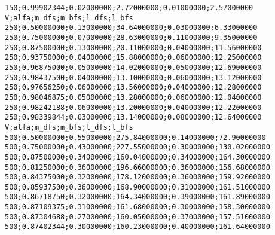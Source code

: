 \documentclass[brazil,times]{abnt}
\begin{document}
\begin{verbatim}
150;0.99902344;0.02000000;2.72000000;0.01000000;2.57000000
V;alfa;m_dfs;m_bfs;l_dfs;l_bfs
250;0.50000000;0.13000000;34.64000000;0.03000000;6.33000000
250;0.75000000;0.07000000;28.63000000;0.11000000;9.35000000
250;0.87500000;0.13000000;20.11000000;0.04000000;11.56000000
250;0.93750000;0.04000000;15.88000000;0.06000000;12.25000000
250;0.96875000;0.05000000;14.02000000;0.05000000;12.69000000
250;0.98437500;0.04000000;13.10000000;0.06000000;13.12000000
250;0.97656250;0.06000000;13.56000000;0.04000000;12.28000000
250;0.98046875;0.05000000;13.28000000;0.06000000;12.04000000
250;0.98242188;0.06000000;13.20000000;0.04000000;12.22000000
250;0.98339844;0.03000000;13.14000000;0.08000000;12.64000000
V;alfa;m_dfs;m_bfs;l_dfs;l_bfs
500;0.50000000;0.55000000;275.84000000;0.14000000;72.90000000
500;0.75000000;0.43000000;227.55000000;0.30000000;130.02000000
500;0.87500000;0.34000000;160.04000000;0.34000000;164.30000000
500;0.81250000;0.36000000;196.66000000;0.36000000;156.68000000
500;0.84375000;0.32000000;178.12000000;0.36000000;159.92000000
500;0.85937500;0.36000000;168.90000000;0.31000000;161.51000000
500;0.86718750;0.32000000;164.34000000;0.39000000;161.89000000
500;0.87109375;0.31000000;161.68000000;0.30000000;158.30000000
500;0.87304688;0.27000000;160.05000000;0.37000000;157.51000000
500;0.87402344;0.30000000;160.23000000;0.40000000;161.64000000
\end{verbatim}

%
%
\end{document}
